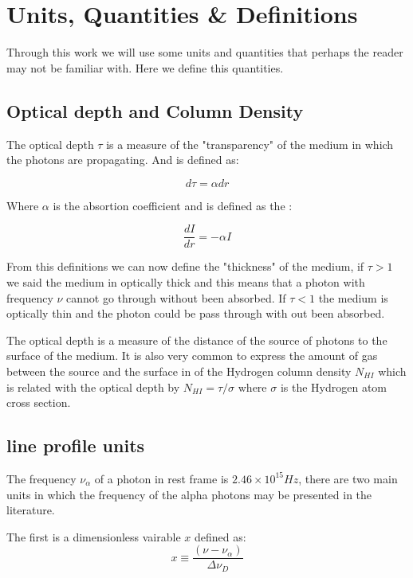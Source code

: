\section{Units, Quantities \& Definitions}

Through this work we will use some units and quantities that perhaps the reader
may not be familiar with. Here we define this quantities.

\subsection{Optical depth and Column Density}

The optical depth $\tau$ is a measure of the "transparency" of the medium
in which the photons are propagating. And is defined as:

\begin{equation}
d\tau = \alpha dr
\end{equation}

Where $\alpha$ is the absortion coefficient and is defined as the  :

\begin{equation}
\dfrac{dI}{dr} = -\alpha I
\end{equation}

From this definitions we can now define the "thickness" of the medium,
if $\tau > 1$ we said the medium in optically thick and this means
that a photon with frequency $\nu$ cannot go through without been
absorbed. If $\tau < 1$ the medium is optically thin and the photon
could be pass through with out been absorbed.

The optical depth is  a measure of the distance of the source
of photons to the surface of the medium. It is also very common 
to express the amount of gas between the \ly source and the surface
in of the Hydrogen column density 
$N_{HI}$ which is related with the optical depth by $N_{HI} = \tau/\sigma$
where $\sigma$ is the Hydrogen atom cross section. 

\subsection{\ly line profile units}

The frequency $\nu_{\alpha}$ of a \ly photon in rest frame is
$2.46\times 10^{15}Hz$,
there are two main units in which the frequency of the \ly alpha photons
may be presented in the literature.

The first is a dimensionless vairable $x$ defined as:
\begin{equation}\label{eq:x}
x   \equiv \dfrac{(\nu -\nu_{\alpha})}{\Delta \nu_D}
\end{equation}

